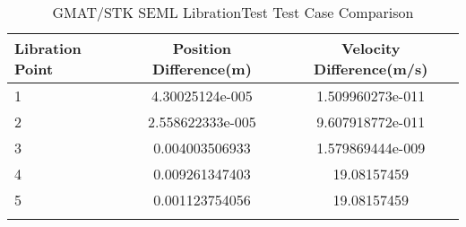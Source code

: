 \begin{table}[htbp!]
\centering
\caption{ GMAT/STK SEML LibrationTest Test Case Comparison}
      \begin{tabular}{lcc}
      \hline\hline
          Libration Point & Position Difference(m) & Velocity Difference(m/s) \\
         \hline
         1 & 4.30025124e-005 & 1.509960273e-011 \\
         2 & 2.558622333e-005 & 9.607918772e-011 \\
         3 & 0.004003506933 & 1.579869444e-009 \\
         4 & 0.009261347403 & 19.08157459 \\
         5 & 0.001123754056 & 19.08157459 \\
      \hline\hline
      \label{Table: SEML LibrationTest Table} 
\end{tabular}
\end{table}
